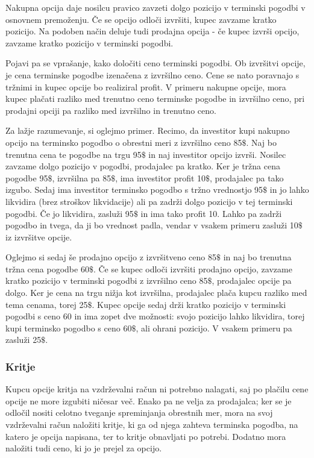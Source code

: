 \documentclass[a4paper]{article}
\begin{document}
Nakupna opcija daje nosilcu pravico zavzeti dolgo pozicijo v terminski pogodbi v osnovnem premoženju. Če se opcijo odloči izvršiti,
kupec zavzame kratko pozicijo. Na podoben način deluje tudi prodajna opcija - če kupec izvrši opcijo, zavzame kratko pozicijo v terminski
pogodbi. 

Pojavi pa se vprašanje, kako določiti ceno terminski pogodbi. Ob izvršitvi opcije, je cena terminske pogodbe izenačena z izvršilno ceno.
Cene se nato poravnajo s tržnimi in kupec opcije bo realiziral profit. V primeru nakupne opcije, mora kupec plačati razliko med trenutno
ceno terminske pogodbe in izvršilno ceno, pri prodajni opciji pa razliko med izvršilno in trenutno ceno.

Za lažje razumevanje, si oglejmo primer. Recimo, da investitor kupi nakupno opcijo na terminsko pogodbo o obrestni meri z izvršilno ceno
85$\$$. Naj bo trenutna cena te pogodbe na trgu 95$\$$ in naj investitor opcijo izvrši. Nosilec zavzame dolgo pozicijo v pogodbi, prodajalec
pa kratko. Ker je tržna cena pogodbe 95$\$$, izvršilna pa 85$\$$, ima investitor profit 10$\$$, prodajalec pa tako izgubo. Sedaj ima
investitor terminsko pogodbo s tržno vrednostjo 95$\$$ in jo lahko likvidira (brez stroškov likvidacije) ali pa zadrži dolgo pozicijo v
tej terminski pogodbi. Če jo likvidira, zasluži 95$\$$ in ima tako profit 10. Lahko pa zadrži pogodbo in tvega, da ji bo vrednost padla,
vendar v vsakem primeru zasluži 10$\$$ iz izvršitve opcije.

Oglejmo si sedaj še prodajno opcijo z izvršitveno ceno 85$\$$ in naj bo trenutna tržna cena pogodbe 60$\$$. Če se kupec odloči
izvršiti prodajno opcijo, zavzame kratko pozicijo v terminski pogodbi z izvršilno ceno 85$\$$, prodajalec opcije pa dolgo. Ker je cena
na trgu nižja kot izvršilna, prodajalec plača kupcu razliko med tema cenama, torej 25$\$$. Kupec opcije sedaj drži kratko pozicijo
v terminski pogodbi s ceno 60 in ima zopet dve možnosti: svojo pozicijo lahko likvidira, torej kupi terminsko pogodbo s ceno 60$\$$, ali
ohrani pozicijo. V vsakem primeru pa zasluži 25$\$$.

\subsubsection{Kritje}
Kupcu opcije kritja na vzdrževalni račun ni potrebno nalagati, saj po plačilu cene opcije ne more izgubiti ničesar več. Enako 
pa ne velja za prodajalca; ker se je odločil nositi celotno tveganje spreminjanja obrestnih mer, mora na svoj vzdrževalni račun
naložiti kritje, ki ga od njega zahteva terminska pogodba, na katero je opcija napisana, ter to kritje obnavljati po potrebi.
Dodatno mora naložiti tudi ceno, ki jo je prejel za opcijo.
\end{document}
